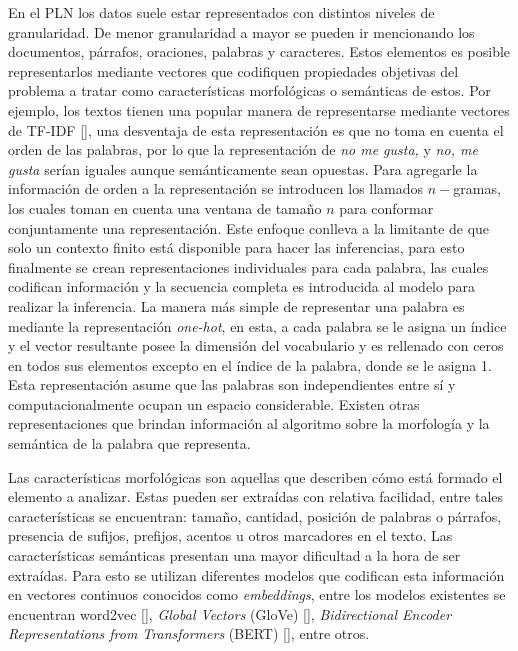 En el PLN los datos suele estar representados con distintos niveles de granularidad.
De menor granularidad a mayor se pueden ir mencionando los documentos, párrafos, oraciones, palabras y
caracteres. Estos elementos es posible representarlos mediante vectores que codifiquen propiedades
objetivas del problema a tratar como características morfológicas o semánticas de estos. Por ejemplo, 
los textos tienen una popular manera de representarse mediante vectores de TF-IDF [\cite{manning2008introduction}],
una desventaja de esta representación es que no toma en cuenta el orden de las palabras, por lo que 
la representación de \emph{no me gusta,} y \emph{no, me gusta} serían iguales aunque semánticamente 
sean opuestas. Para agregarle la información de orden a la representación se introducen los llamados 
$n-$gramas, los cuales toman en cuenta una ventana de tamaño $n$ para conformar conjuntamente una representación.
Este enfoque conlleva a la limitante de que solo un contexto finito está disponible para hacer las inferencias,
para esto finalmente se crean representaciones individuales para cada palabra, las cuales codifican 
información y la secuencia completa es introducida al modelo para realizar la inferencia.
La manera más simple de representar una palabra es mediante la representación \emph{one-hot}, 
en esta, a cada palabra se le asigna un índice y el vector resultante posee la dimensión del 
vocabulario y es rellenado con ceros en todos sus elementos excepto en el índice de la palabra, donde se le asigna 1.
Esta representación asume que las palabras son independientes entre sí y 
computacionalmente ocupan un espacio considerable. Existen otras representaciones 
que brindan información al algoritmo sobre la morfología y la semántica de la palabra que representa.

Las características morfológicas son aquellas que describen cómo está formado el elemento a analizar.
Estas pueden ser extraídas con relativa facilidad, entre tales características se encuentran: tamaño, 
cantidad, posición de palabras o párrafos, presencia de sufijos, prefijos, acentos u otros marcadores
en el texto. Las características semánticas presentan una mayor dificultad a la hora de ser extraídas.
Para esto se utilizan diferentes modelos que codifican esta información en vectores continuos conocidos como 
\emph{embeddings}, entre los modelos existentes se encuentran
word2vec [\cite{mikolov2013efficient}], 
\emph{Global Vectors} (GloVe) [\cite{pennington2014glove}], 
\emph{Bidirectional Encoder Representations from Transformers} (BERT) [\cite{devlin2018bert}],
entre otros.

